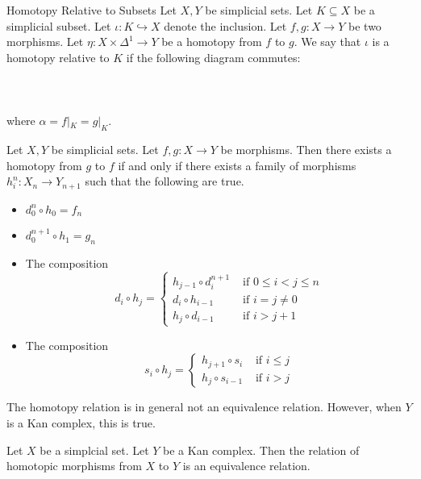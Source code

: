 \documentclass[a4paper]{article}
\begin{document}
\begin{defn}{Homotopy Relative to Subsets}{} Let $X,Y$ be simplicial sets. Let $K\subseteq X$ be a simplicial subset. Let $\iota:K\hookrightarrow X$ denote the inclusion. Let $f,g:X\to Y$ be two morphisms. Let $\eta:X\times\Delta^1\to Y$ be a homotopy from $f$ to $g$. We say that $\iota$ is a homotopy relative to $K$ if the following diagram commutes: \\~\\
\\~\\
where $\alpha=f|_K=g|_K$. 
\end{defn}

\begin{prp}{}{} Let $X,Y$ be simplicial sets. Let $f,g:X\to Y$ be morphisms. Then there exists a homotopy from $g$ to $f$ if and only if there exists a family of morphisms $h_i^n:X_n\to Y_{n+1}$ such that the following are true. 
\begin{itemize}
\item $d_0^n\circ h_0=f_n$
\item $d_0^{n+1}\circ h_1=g_n$
\item The composition $$d_i\circ h_j=\begin{cases}
h_{j-1}\circ d_i^{n+1} & \text{ if } 0\leq i<j\leq n\\
d_i\circ h_{i-1} & \text{ if } i=j\neq 0\\
h_j\circ d_{i-1}& \text{ if } i>j+1
\end{cases}$$
\item The composition $$s_i\circ h_j=\begin{cases}
h_{j+1}\circ s_i & \text{ if } i\leq j\\
h_j\circ s_{i-1} & \text{ if } i>j
\end{cases}$$
\end{itemize}
\end{prp}

The homotopy relation is in general not an equivalence relation. However, when $Y$ is a Kan complex, this is true. 

\begin{prp}{}{} Let $X$ be a simplcial set. Let $Y$ be a Kan complex. Then the relation of homotopic morphisms from $X$ to $Y$ is an equivalence relation. 
\end{prp}
\end{document}
